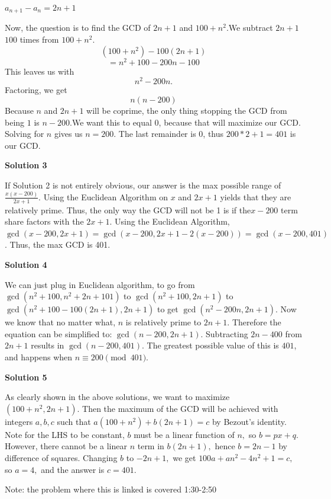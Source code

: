 \begin{enumerate}
 $a_{n+1}-a_n = 2n+1$

 Now, the question is to find the GCD of $2n+1$ and $100+n^2$.We subtract $2n+1$ $100$ times from $100+n^2$.
 \[(100+n^2)-100(2n+1)\]
 \[=n^2+100-200n-100\]This leaves us with 
 \[n^2-200n.\]Factoring, we get 
 \[n(n-200)\]Because $n$ and $2n+1$ will be coprime, the only thing stopping the GCD from being $1$ is $n-200.$We want this to equal 0, because that will maximize our GCD. Solving for $n$ gives us $n=200$. The last remainder is 0, thus $200*2+1 = \boxed{401}$ is our GCD.

 



\textbf{Solution 3}

If Solution 2 is not entirely obvious, our answer is the max possible range of $\frac{x(x-200)}{2x+1}$. Using the Euclidean Algorithm on $x$ and $2x+1$ yields that they are relatively prime. Thus, the only way the GCD will not be 1 is if the$x-200$ term share factors with the $2x+1$. Using the Euclidean Algorithm, $\gcd(x-200,2x+1)=\gcd(x-200,2x+1-2(x-200))=\gcd(x-200,401)$. Thus, the max GCD is 401.

 



\textbf{Solution 4}

We can just plug in Euclidean algorithm, to go from $\gcd(n^2 + 100, n^2 + 2n + 101)$ to $\gcd(n^2 + 100, 2n + 1)$ to $\gcd(n^2 + 100 - 100(2n + 1), 2n + 1)$ to get $\gcd(n^2 - 200n, 2n + 1)$. Now we know that no matter what, $n$ is relatively prime to $2n + 1$. Therefore the equation can be simplified to: $\gcd(n - 200, 2n + 1)$. Subtracting $2n - 400$ from $2n + 1$ results in $\gcd(n - 200,401)$. The greatest possible value of this is $\boxed{401}$, and happens when $n \equiv 200 \pmod{401}$.

 



\textbf{Solution 5}

As clearly shown in the above solutions, we want to maximize $(100+n^2, 2n+1).$ Then the maximum of the GCD will be achieved with integers $a,b,c$ such that $a(100+n^2) + b(2n+1)=c$ by Bezout's identity. Note for the LHS to be constant, $b$ must be a linear function of $n,$ so $b=px+q.$ However, there cannot be a linear $n$ term in $b(2n+1),$ hence $b=2n-1$ by difference of squares. Changing $b$ to $-2n+1,$ we get $100a+an^2-4n^2+1=c,$ so $a=4,$ and the answer is $c=\boxed{401}.$ 

 Note: the problem where this is linked is covered 1:30-2:50


\end{enumerate}

